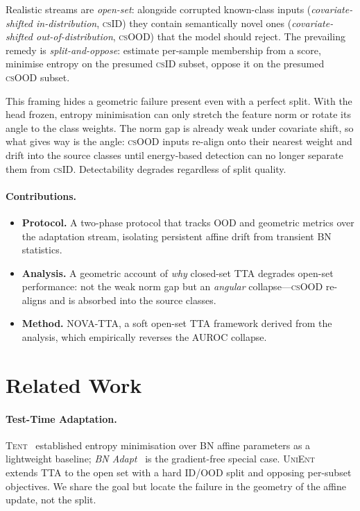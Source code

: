\documentclass[11pt]{article}
\newcommand{\csid}{\textsc{cs}ID}
\newcommand{\csood}{\textsc{cs}OOD}
\newcommand{\method}[1]{\textsc{#1}}
\begin{document}
Realistic streams are \emph{open-set}: alongside corrupted known-class
inputs (\emph{covariate-shifted in-distribution}, \csid) they contain
semantically novel ones (\emph{covariate-shifted out-of-distribution},
\csood) that the model should reject. The prevailing remedy is
\emph{split-and-oppose}: estimate per-sample membership from a score,
minimise entropy on the presumed \csid{} subset, oppose it on the
presumed \csood{} subset.

This framing hides a geometric failure present even with a perfect split.
With the head frozen, entropy minimisation can only stretch the feature
norm or rotate its angle to the class weights. The norm gap is already
weak under covariate shift, so what gives way is the angle: \csood{}
inputs re-align onto their nearest weight and drift into the source
classes until energy-based detection can no longer separate them from
\csid. Detectability degrades regardless of split quality.

\paragraph{Contributions.}
\begin{itemize}\itemsep2pt
  \item \textbf{Protocol.} A two-phase protocol that tracks OOD and
  geometric metrics over the adaptation stream, isolating persistent
  affine drift from transient BN statistics.
  \item \textbf{Analysis.} A geometric account of \emph{why} closed-set
  TTA degrades open-set performance: not the weak norm gap but an
  \emph{angular} collapse---\csood{} re-aligns and is absorbed into the
  source classes.
  \item \textbf{Method.} \method{NOVA-TTA}, a soft open-set TTA framework
  derived from the analysis, which empirically reverses the AUROC
  collapse.
\end{itemize}

\section{Related Work}

\paragraph{Test-Time Adaptation.} \method{Tent}~\cite{tent} established
entropy minimisation over BN affine parameters as a lightweight baseline;
\emph{BN Adapt}~\cite{bnadapt} is the gradient-free special case.
\method{UniEnt}~\cite{unient} extends TTA to the open set with a hard
ID/OOD split and opposing per-subset objectives. We share the goal but
locate the failure in the geometry of the affine update, not the split.
\end{document}
